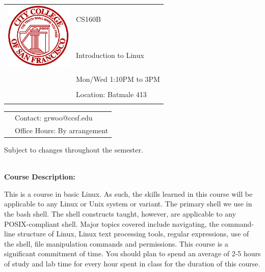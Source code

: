 \documentclass[11pt]{article}
\begin{document}
\begin{tabular}{ l l }
  \multirow{3}{*}{\includegraphics[height=1.25in,width=1.25in]{logo_ccsf.png}} & \LARGE CS160B \\\\
                                                                             & \LARGE Introduction to Linux \\\\
  & \LARGE Mon/Wed 1:10PM to 3PM \\\\
  & \LARGE Location: Batmale 413\\\\
\end{tabular}
\vspace{10mm}

\begin{tabular}{ l l }
  & \large Contact: grwoo@ccsf.edu \\
  & \large Office Hours: By arrangement\\
\end{tabular}
\vspace{5mm}
\begin{center} Subject to changes throughout the semester.\\
\end{center}

\textbf {\large \\ Course Description:}

This is a course in basic Linux. As such, the skills learned in this course
will be applicable to any Linux or Unix system or variant. The primary shell we
use in the bash shell. The shell constructs taught, however, are applicable to
any POSIX-compliant shell. Major topics covered include navigating, the
command-line structure of Linux, Linux text processing tools, regular
expressions, use of the shell, file manipulation commands and permissions.
This course is a significant commitment of time. You should plan to spend an
average of 2-5 hours of study and lab time for every hour spent in class for
the duration of this course.\\
\end{document}
